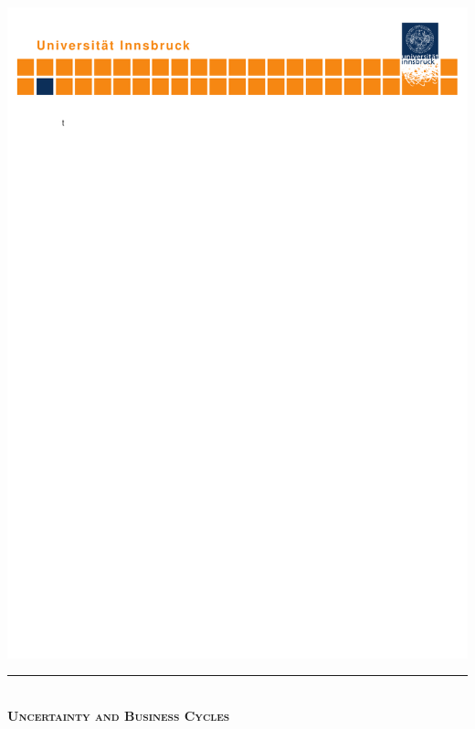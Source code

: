 \documentclass[a4paper,12pt,oneside,pointednumbers,numbers=noenddot,bibtotoc,bigheadings,liststotoc,chapterprefix=true]{scrbook}
\begin{document}
\begin{titlepage}
    \begin{center}
        \hspace*{-0.27\textwidth}\includegraphics[width=1.419\textwidth, trim = 5mm 250mm 0mm 0mm, clip = TRUE]{logo.pdf}\hspace*{-0.3\textwidth}
        \quad \\[0mm]
        \newcommand{\HRule}{\rule{\linewidth}{0.3mm}} %
        \HRule \\[-1mm]
        \Huge{\scshape\bfseries Uncertainty and Business Cycles} \\[-5mm]

\end{center}
\end{titlepage}
\end{document}
